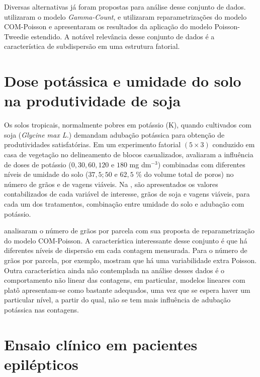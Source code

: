 \documentclass[
    oldfontcommands,
    11pt,
    openright,
    twoside,
    a4paper,
    english,
    brazil
]{abntex2}\usepackage[]{graphicx}\usepackage[]{color}
\begin{document}
Diversas alternativas já foram propostas para análise desse conjunto de
dados. \citet{Zeviani2014} utilizaram o modelo \textit{Gamma-Count},
\citet{Huang2017} e \citet{RibeiroJr2018} utilizaram reparametrizações
do modelo COM-Poisson e \citet{Bonat2018} apresentaram os resultados da
aplicação do modelo Poisson-Tweedie estendido. A notável relevância
desse conjunto de dados é a característica de subdispersão em uma
estrutura fatorial.

\section{Dose potássica e umidade do solo na produtividade de soja}
\label{sec:soybean}

Os solos tropicais, normalmente pobres em potássio (K), quando
cultivados com soja (\textit{Glycine max L.}) demandam adubação
potássica para obtenção de produtividades satisfatórias. Em um
experimento fatorial $(5 \times 3)$ conduzido em casa de vegetação no
delineamento de blocos casualizados, \citet{Serafim2012} avaliaram a
influência de doses de potássio ($0, 30, 60, 120$ e $180$ mg dm$^{-3}$)
combinadas com diferentes níveis de umidade do solo ($37,5; 50$ e $62,5$
\% do volume total de poros) no número de grãos e de vagens viáveis. Na
, são apresentados os valores contabilizados de
cada variável de interesse, grãos de soja e vagens viáveis, para cada um
dos tratamentos, combinação entre umidade do solo e adubação com
potássio.



\citet{RibeiroJr2018} analisaram o número de grãos por parcela com sua
proposta de reparametrização do modelo COM-Poisson. A característica
interessante desse conjunto é que há diferentes níveis de dispersão em
cada contagem mensurada. Para o número de grãos por parcela, por
exemplo, \citet{RibeiroJr2018} mostram que há uma variabilidade extra
Poisson. Outra característica ainda não contemplada na análise desses
dados é o comportamento não linear das contagens, em particular, modelos
lineares com platô apresentam-se como bastante adequados, uma vez que se
espera haver um particular nível, a partir do qual, não se tem mais
influência de adubação potássica nas contagens.

\section{Ensaio clínico em pacientes epilépticos}
\label{sec:epilepsy}
\end{document}
